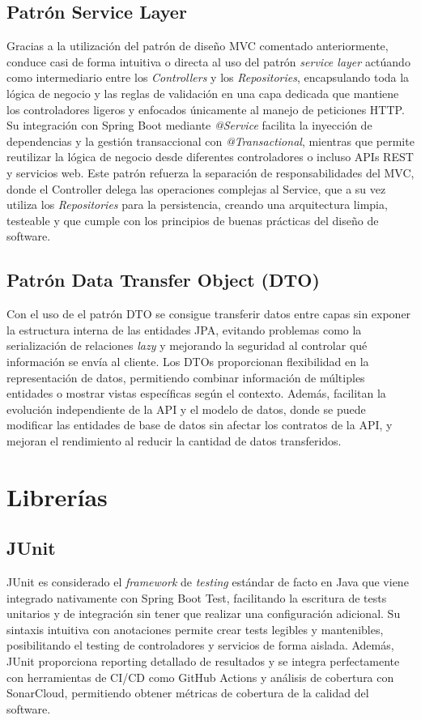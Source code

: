 \subsection{Patrón Service Layer}\label{patron-service-layer}
Gracias a la utilización del patrón de diseño MVC comentado anteriormente, conduce casi de forma intuitiva o directa al uso del patrón \emph{service layer} actúando como intermediario entre los \emph{Controllers} y los \emph{Repositories}, encapsulando toda la lógica de negocio y las reglas de validación en una capa dedicada que mantiene los controladores ligeros y enfocados únicamente al manejo de peticiones HTTP. Su integración con Spring Boot mediante \emph{@Service} facilita la inyección de dependencias y la gestión transaccional con \emph{@Transactional}, mientras que permite reutilizar la lógica de negocio desde diferentes controladores o incluso APIs REST y servicios web. Este patrón refuerza la separación de responsabilidades del MVC, donde el Controller delega las operaciones complejas al Service, que a su vez utiliza los \emph{Repositories} para la persistencia, creando una arquitectura limpia, testeable y que cumple con los principios de buenas prácticas del diseño de software.

\subsection{Patrón Data Transfer Object (DTO)}\label{patron-data-transfer-object}
Con el uso de el patrón DTO se consigue transferir datos entre capas sin exponer la estructura interna de las entidades JPA, evitando problemas como la serialización de relaciones \emph{lazy} y mejorando la seguridad al controlar qué información se envía al cliente. Los DTOs proporcionan flexibilidad en la representación de datos, permitiendo combinar información de múltiples entidades o mostrar vistas específicas según el contexto. Además, facilitan la evolución independiente de la API y el modelo de datos, donde se puede modificar las entidades de base de datos sin afectar los contratos de la API, y mejoran el rendimiento al reducir la cantidad de datos transferidos.

\section{Librerías}\label{librerias}

\subsection{JUnit}\label{junit}
JUnit es considerado el \emph{framework} de \emph{testing} estándar de facto en Java que viene integrado nativamente con Spring Boot Test, facilitando la escritura de tests unitarios y de integración sin tener que realizar una configuración adicional. Su sintaxis intuitiva con anotaciones permite crear tests legibles y mantenibles, posibilitando el testing de controladores y servicios de forma aislada. Además, JUnit proporciona reporting detallado de resultados y se integra perfectamente con herramientas de CI/CD como GitHub Actions y análisis de cobertura con SonarCloud, permitiendo obtener métricas de cobertura de la calidad del software.

